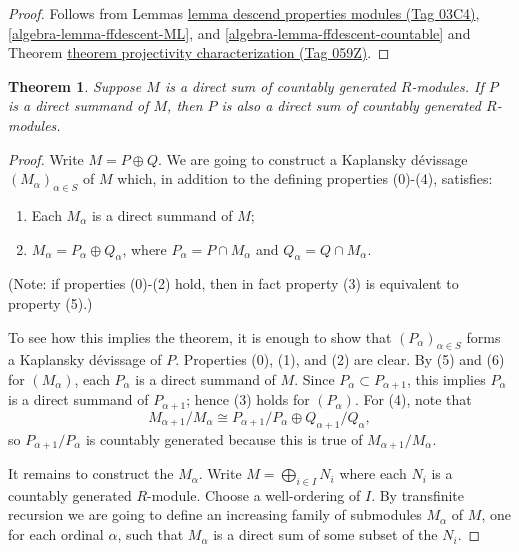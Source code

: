 \documentclass{amsart}
\theoremstyle{plain}
\newtheorem{theorem}[subsection]{Theorem}
\theoremstyle{definition}
\theoremstyle{remark}
\numberwithin{equation}{subsection}
\begin{document}
\begin{proof}
Follows from Lemmas \href{https://stacks.math.columbia.edu/tag/03C4}{lemma descend properties modules (Tag 03C4)},
\ref{algebra-lemma-ffdescent-ML}, and \ref{algebra-lemma-ffdescent-countable} and
Theorem \href{https://stacks.math.columbia.edu/tag/059Z}{theorem projectivity characterization (Tag 059Z)}.
\end{proof}


\begin{theorem}
\label{algebra-theorem-kaplansky-direct-sum}
Suppose $M$ is a direct sum of countably generated $R$-modules.  If $P$ is a
direct summand of $M$, then $P$ is also a direct sum of countably generated
$R$-modules.
\end{theorem}

\begin{proof}
Write $M = P \oplus Q$.  We are going to construct a Kaplansky d\'evissage
$(M_{\alpha})_{\alpha \in S}$ of $M$ which, in addition to the defining
properties (0)-(4), satisfies:
\begin{enumerate}
\item[(5)] Each $M_{\alpha}$ is a direct summand of $M$;
\item[(6)] $M_{\alpha} = P_{\alpha} \oplus Q_{\alpha}$, where $P_{\alpha} =P
\cap M_{\alpha}$ and $Q_\alpha = Q \cap M_{\alpha}$.
\end{enumerate}
(Note: if properties (0)-(2) hold, then in fact property (3) is equivalent to
property (5).)

\medskip\noindent
To see how this implies the theorem, it is enough to show that
$(P_{\alpha})_{\alpha \in S}$ forms a Kaplansky d\'evissage of $P$.  Properties
(0), (1), and (2) are clear.  By (5) and (6) for $(M_{\alpha})$, each
$P_{\alpha}$ is a direct summand of $M$.  Since $P_{\alpha} \subset P_{\alpha +
1}$, this implies $P_{\alpha}$ is a direct summand of $P_{\alpha + 1}$; hence
(3) holds for $(P_{\alpha})$.  For (4), note that
$$
M_{\alpha + 1}/M_{\alpha} \cong P_{\alpha + 1}/P_{\alpha} \oplus
Q_{\alpha + 1}/Q_{\alpha},
$$
so $P_{\alpha + 1}/P_{\alpha}$ is countably generated because this is true of
$M_{\alpha + 1}/M_{\alpha}$.

\medskip\noindent
It remains to construct the $M_{\alpha}$.  Write $M = \bigoplus_{i \in I} N_i$
where each $N_i$ is a countably generated $R$-module.  Choose a well-ordering
of $I$.  By transfinite recursion we are going to define an increasing family
of submodules $M_{\alpha}$ of $M$, one for each ordinal $\alpha$, such that
$M_{\alpha}$ is a direct sum of some subset of the $N_i$.


\end{proof}
\end{document}
